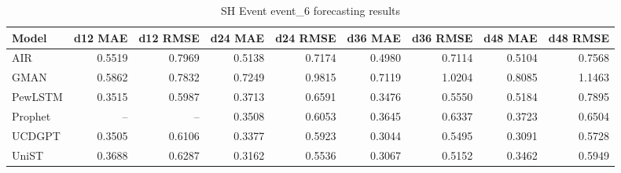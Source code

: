 \begin{table}[htbp]
\centering
\small
\caption{SH Event event\_6 forecasting results}
\label{tab:sh-event-event-6}
\begin{tabular}{lrrrrrrrr}
\toprule
Model & d12 MAE & d12 RMSE & d24 MAE & d24 RMSE & d36 MAE & d36 RMSE & d48 MAE & d48 RMSE \\
\midrule
AIR & 0.5519 & 0.7969 & 0.5138 & 0.7174 & 0.4980 & 0.7114 & 0.5104 & 0.7568 \\
GMAN & 0.5862 & 0.7832 & 0.7249 & 0.9815 & 0.7119 & 1.0204 & 0.8085 & 1.1463 \\
PewLSTM & 0.3515 & 0.5987 & 0.3713 & 0.6591 & 0.3476 & 0.5550 & 0.5184 & 0.7895 \\
Prophet & -- & -- & 0.3508 & 0.6053 & 0.3645 & 0.6337 & 0.3723 & 0.6504 \\
UCDGPT & 0.3505 & 0.6106 & 0.3377 & 0.5923 & 0.3044 & 0.5495 & 0.3091 & 0.5728 \\
UniST & 0.3688 & 0.6287 & 0.3162 & 0.5536 & 0.3067 & 0.5152 & 0.3462 & 0.5949 \\
\bottomrule
\end{tabular}
\end{table}
